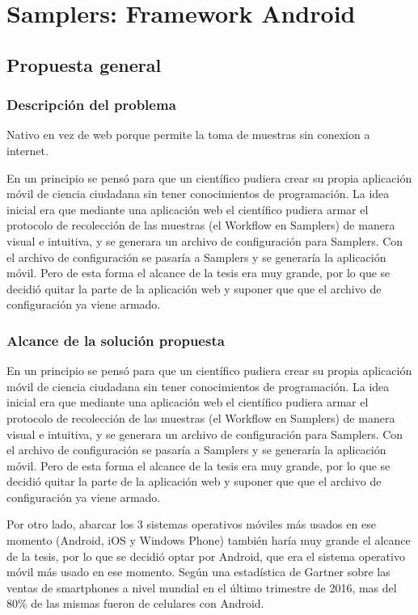 \chapter{Samplers: Framework Android}

\section{Propuesta general}

\subsection{Descripción del problema}
Nativo en vez de web porque permite la toma de muestras sin conexion a internet.

En un principio se pensó para que un científico pudiera crear su propia aplicación móvil de ciencia ciudadana sin tener conocimientos de programación. La idea inicial era que mediante una aplicación web el científico pudiera armar el protocolo de recolección de las muestras (el Workflow en Samplers) de manera visual e intuitiva, y se generara un archivo de configuración para Samplers. Con el archivo de configuración se pasaría a Samplers y se generaría la aplicación móvil. Pero de esta forma el alcance de la tesis era muy grande, por lo que se decidió quitar la parte de la aplicación web y suponer que que el archivo de configuración ya viene armado.

\subsection{Alcance de la solución propuesta}
En un principio se pensó para que un científico pudiera crear su propia aplicación móvil de ciencia ciudadana sin tener conocimientos de programación. La idea inicial era que mediante una aplicación web el científico pudiera armar el protocolo de recolección de las muestras (el Workflow en Samplers) de manera visual e intuitiva, y se generara un archivo de configuración para Samplers. Con el archivo de configuración se pasaría a Samplers y se generaría la aplicación móvil. Pero de esta forma el alcance de la tesis era muy grande, por lo que se decidió quitar la parte de la aplicación web y suponer que que el archivo de configuración ya viene armado.

Por otro lado, abarcar los 3 sistemas operativos móviles más usados en ese momento (Android, iOS y Windows Phone) también haría muy grande el alcance de la tesis, por lo que se decidió optar por Android, que era el sistema operativo móvil más usado en ese momento. Según una estadística de Gartner sobre las ventas de smartphones a nivel mundial en el último trimestre de 2016\cite{gartner}, mas del 80\% de las mismas fueron de celulares con Android.


